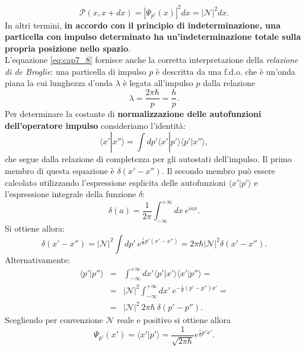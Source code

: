 \documentclass[a4paper,12pt,oneside]{book}
\begin{document}
\begin{equation}
\mathcal{P}(x,x+dx) = |\Psi_{p'}(x)|^2 dx = |\mathcal{N}|^2 dx.
\end{equation}
\noindent In altri termini, \textbf{in accordo con il principio di indeterminazione, una particella con impulso determinato ha un'indeterminazione totale sulla propria posizione nello spazio}.\\
L'equazione \eqref{eq:cap7_8} fornisce anche la corretta interpretazione della \emph{relazione di de Broglie}: una particella di impulso $p$ è descritta da una f.d.o. che è un'onda piana la cui lunghezza d'onda $\lambda$ è legata all'impulso $p$ dalla relazione
\begin{equation}
\lambda = \frac{2 \pi \hbar}{p} = \frac{h}{p}.
\end{equation}
Per determinare la costante di \textbf{normalizzazione delle autofunzioni dell'operatore impulso} consideriamo l'identità:
\begin{equation}
\langle x' | x'' \rangle = \int dp' \langle x' | p' \rangle \langle p' | x'' \rangle,
\end{equation}
che segue dalla relazione di completezza per gli autostati dell'impulso. Il primo membro di questa equazione è $\delta (x' - x'')$. Il secondo membro può essere calcolato utilizzando l'espressione esplicita delle autofunzioni $\langle x' | p' \rangle$ e l'espressione integrale della funzione $\delta$:
\begin{equation}
\delta (a) = \frac{1}{2 \pi} \int_{-\infty}^{+ \infty} dx ~ e^{i a x}.
\end{equation}
\noindent Si ottiene allora:
\begin{equation}
\delta (x' - x'') = |\mathcal{N}|^2 \int dp' ~ e^{\frac{i}{\hbar}p' (x' - x'')} = 2 \pi \hbar |\mathcal{N}|^2 \delta (x' - x'').
\end{equation}
Alternativamente:
\begin{eqnarray}
\langle p' | p'' \rangle &=& \int_{-\infty}^{+ \infty} dx' \langle p' | x' \rangle \langle x' | p'' \rangle = \nonumber \\
&=&  |\mathcal{N}|^2 \int_{-\infty}^{+ \infty} dx' ~ e^{-\frac{i}{\hbar}(p'-p'')x'}= \nonumber \\
&=&  |\mathcal{N}|^2 ~ 2 \pi \hbar ~ \delta (p'-p'') .
\end{eqnarray}
Scegliendo per convenzione $\mathcal{N}$ reale e positivo si ottiene allora
\begin{equation}
\Psi_{p'}(x') = \langle x' | p' \rangle = \frac{1}{\sqrt{2 \pi \hbar}} e^{\frac{i}{\hbar}p'x'}.
\end{equation}
\end{document}
